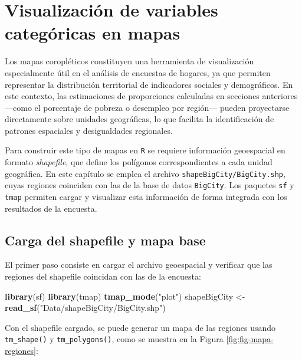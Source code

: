 \documentclass[
  spanish,
  12pt,
]{book}
\newenvironment{Shaded}{\begin{snugshade}}{\end{snugshade}}
\newcommand{\FunctionTok}[1]{\textcolor[rgb]{0.13,0.29,0.53}{\textbf{#1}}}
\newcommand{\NormalTok}[1]{#1}
\newcommand{\OtherTok}[1]{\textcolor[rgb]{0.56,0.35,0.01}{#1}}
\newcommand{\StringTok}[1]{\textcolor[rgb]{0.31,0.60,0.02}{#1}}
\begin{document}
\section{Visualización de variables categóricas en mapas}\label{viz-mapas}

Los mapas coropléticos constituyen una herramienta de visualización especialmente útil en el análisis de encuestas de hogares, ya que permiten representar la distribución territorial de indicadores sociales y demográficos. En este contexto, las estimaciones de proporciones calculadas en secciones anteriores ---como el porcentaje de pobreza o desempleo por región--- pueden proyectarse directamente sobre unidades geográficas, lo que facilita la identificación de patrones espaciales y desigualdades regionales.

Para construir este tipo de mapas en \texttt{R} se requiere información geoespacial en formato \emph{shapefile}, que define los polígonos correspondientes a cada unidad geográfica. En este capítulo se emplea el archivo \texttt{shapeBigCity/BigCity.shp}, cuyas regiones coinciden con las de la base de datos \texttt{BigCity}. Los paquetes \texttt{sf} \citep{sf2018} y \texttt{tmap} \citep{tmap2023} permiten cargar y visualizar esta información de forma integrada con los resultados de la encuesta.

\subsection{Carga del shapefile y mapa base}\label{carga-del-shapefile-y-mapa-base}

El primer paso consiste en cargar el archivo geoespacial y verificar que las regiones del shapefile coincidan con las de la encuesta:

\begin{Shaded}
\begin{Highlighting}[]
\FunctionTok{library}\NormalTok{(sf)}
\FunctionTok{library}\NormalTok{(tmap)}
\FunctionTok{tmap\_mode}\NormalTok{(}\StringTok{"plot"}\NormalTok{)}
\NormalTok{shapeBigCity }\OtherTok{\textless{}{-}} \FunctionTok{read\_sf}\NormalTok{(}\StringTok{"Data/shapeBigCity/BigCity.shp"}\NormalTok{)}
\end{Highlighting}
\end{Shaded}

Con el shapefile cargado, se puede generar un mapa de las regiones usando \texttt{tm\_shape()} y \texttt{tm\_polygons()}, como se muestra en la Figura \ref{fig:fig-mapa-regiones}:
\end{document}
